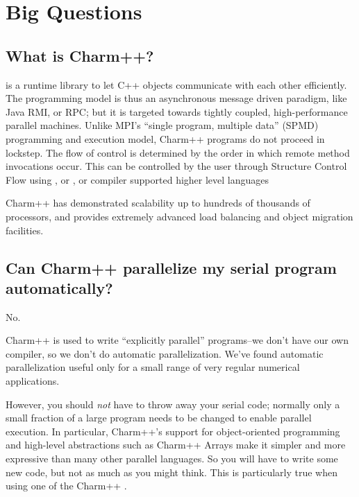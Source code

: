 \section{Big Questions}

\subsection{What is Charm++?}

is a runtime library to let C++ objects communicate with each other
efficiently.  The programming model is thus an asynchronous message
driven paradigm, like Java RMI, or RPC; but it is targeted towards
tightly coupled, high-performance parallel machines.  Unlike MPI's
``single program, multiple data'' (SPMD) programming and execution model, Charm++ programs do not proceed in lockstep.  The flow of control is determined by the order in which remote method invocations occur.  This can be controlled by the user through Structure Control Flow using  , or , or compiler supported higher level languages 

Charm++ has demonstrated scalability up to hundreds of thousands of processors,
and provides extremely advanced load balancing and object migration facilities.

\subsection{Can Charm++ parallelize my serial program automatically?}

No.

Charm++ is used to write ``explicitly parallel'' programs--we don't have
our own compiler, so we don't do automatic parallelization. We've found
automatic parallelization useful only for a small range of very regular
numerical applications.

However, you should { \em not} have to throw away your serial code;
normally only a small fraction of a large program needs to be changed to
enable parallel execution. In particular, Charm++'s support for object-oriented
programming and high-level abstractions such as Charm++ Arrays make it
simpler and more expressive than many other parallel languages. So you
will have to write some new code, but not as much as you might think. This
is particularly true when using one of the Charm++ .


